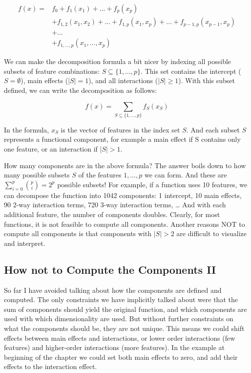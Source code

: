 \documentclass[
  12pt,
]{krantz}
\begin{document}
\begin{align*}f(x) = & f_0 + f_1(x_1) + \ldots + f_p(x_p) \\ & + f_{1,2}(x_1, x_2) + \ldots + f_{1,p}(x_1, x_p) + \ldots + f_{p-1,p}(x_{p-1}, x_p) \\  & + \ldots  \\ & +  f_{1,\ldots,p}(x_1, \ldots, x_p)\end{align*}

We can make the decomposition formula a bit nicer by indexing all possible subsets of feature combinations: \(S\subseteq\{1,\ldots,p\}\).
This set contains the intercept (\(S=\emptyset\)), main effects (\(|S|=1\)), and all interactions (\(|S|\geq{}1\)).
With this subset defined, we can write the decomposition as follows:

\[f(x) = \sum_{S\subseteq\{1,\ldots,p\}} f_S(x_S)\]

In the formula, \(x_S\) is the vector of features in the index set \(S\).
And each subset \(S\) represents a functional component, for example a main effect if S contains only one feature, or an interaction if \(|S| > 1\).

How many components are in the above formula?
The answer boils down to how many possible subsets \(S\) of the features \(1,\ldots, p\) we can form.
And these are \(\sum_{i=0}^p\binom{p}{i}=2^p\) possible subsets!
For example, if a function uses 10 features, we can decompose the function into 1042 components: 1 intercept, 10 main effects, 90 2-way interaction terms, 720 3-way interaction terms, \ldots{}
And with each additional feature, the number of components doubles.
Clearly, for most functions, it is not feasible to compute all components.
Another reasons NOT to compute all components is that components with \(|S|>2\) are difficult to visualize and interpret.

\hypertarget{how-not-to-compute-the-components-ii}{%
\subsection{How not to Compute the Components II}\label{how-not-to-compute-the-components-ii}}

So far I have avoided talking about how the components are defined and computed.
The only constraints we have implicitly talked about were that the sum of components should yield the original function, and which components are used with which dimensionality are used.
But without further constraints on what the components should be, they are not unique.
This means we could shift effects between main effects and interactions, or lower order interactions (few features) and higher-order interactions (more features).
In the example at beginning of the chapter we could set both main effects to zero, and add their effects to the interaction effect.
\end{document}
